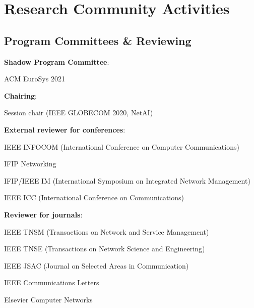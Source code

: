 \section{Research Community Activities}
\subsection{Program Committees \& Reviewing}
\begin{cvitemize}
	\item \textbf{Shadow Program Committee}:
	\begin{inlineItemize}
		\item ACM EuroSys 2021
	\end{inlineItemize}
	\item \textbf{Chairing}:
	\begin{inlineItemize}
		\item Session chair (IEEE GLOBECOM 2020, NetAI)
	\end{inlineItemize}
	\item \textbf{External reviewer for conferences}:
	\begin{inlineItemize}
		\item IEEE INFOCOM (International Conference on Computer Communications)
		\item IFIP Networking
		\item IFIP/IEEE IM (International Symposium on Integrated Network Management)
		\item IEEE ICC (International Conference on Communications)
	\end{inlineItemize}
	\item \textbf{Reviewer for journals}:
	\begin{inlineItemize}
		\item IEEE TNSM (Transactions on Network and Service Management)
		\item IEEE TNSE (Transactions on Network Science and Engineering)
		\item IEEE JSAC (Journal on Selected Areas in Communication)
		\item IEEE Communications Letters
		\item Elsevier Computer Networks
	\end{inlineItemize}
\end{cvitemize}

\pagebreak

